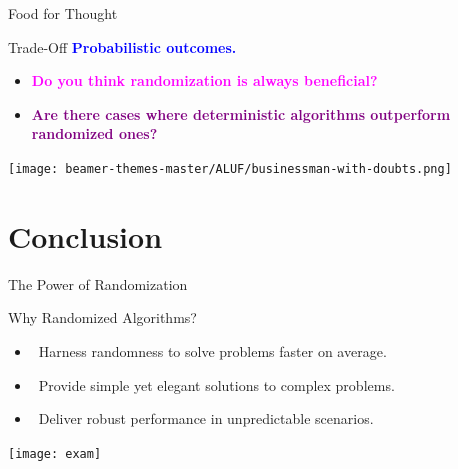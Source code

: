 \documentclass{beamer}
\begin{document}
\begin{frame}{Food for Thought}
    \begin{block}{Trade-Off}
        \small
        \textcolor{blue}{\textbf{Probabilistic outcomes.}} 
    \end{block}
   \pause
    \vspace{0.3cm}
    \begin{itemize}
        \item \textcolor{magenta}{\textbf{Do you think randomization is always beneficial?}}
    \end{itemize}
    \vspace{0.2cm}
\pause
    \begin{itemize}
        \item \textcolor{purple}{\textbf{Are there cases where deterministic algorithms outperform randomized ones?}}
    \end{itemize}

    \vspace{-0.1cm}
    \begin{center}
        \texttt{[image: beamer-themes-master/ALUF/businessman-with-doubts.png]}
    \end{center} 
\end{frame}
\section{Conclusion}

\begin{frame}{The Power of Randomization}
    \begin{block}{Why Randomized Algorithms?}
        \begin{itemize}
            \item<1-> \faBolt \ \alert{Harness randomness} to solve problems faster on average.
            \item<2-> \faLightbulb \ Provide simple yet \alert{elegant solutions} to complex problems.
            \item<3-> \faCogs \ Deliver \alert{robust performance} in unpredictable scenarios.
        \end{itemize}
    \end{block}
    \vspace{0.5cm}
    \centering
    \texttt{[image: exam]}
\end{frame}
\end{document}
